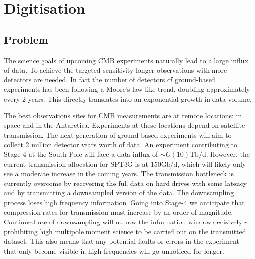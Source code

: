 \documentclass[apj]{emulateapj}
\begin{document}





\section{Digitisation}
\label{sec:dig}

\subsection{Problem}
\label{subsec:problem}


The science goals of upcoming CMB experiments naturally lead to a large influx of data. To achieve the targeted sensitivity longer observations with more detectors are needed. In fact the number of detectors of ground-based experiments has been following a Moore's law like trend, doubling approximately every 2 years. This directly translates into an exponential growth in data volume.

The best observations sites for CMB measurements are at remote locations: in space and in the Antarctica. Experiments at these locations depend on satellite transmission. The next generation of ground-based experiments will aim to collect 2 million detector years worth of data. An experiment contributing to Stage-4 at the South Pole will face a data influx of $\sim O(10)\mathrm{Tb/d}$. However, the current transmission allocation for SPT3G is at $150\mathrm{Gb/d}$, which will likely only see a moderate increase in the coming years. The transmission bottleneck is currently overcome by recovering the full data on hard drives with some latency and by transmitting a downsampled version of the data. The downsampling process loses high frequency information. Going into Stage-4 we anticipate that compression rates for transmission must increase by an order of magnitude. Continued use of downsampling will narrow the information window decisively - prohibiting high multipole moment science to be carried out on the transmitted dataset. This also means that any potential faults or errors in the experiment that only become visible in high frequencies will go unnoticed for longer.
\end{document}
